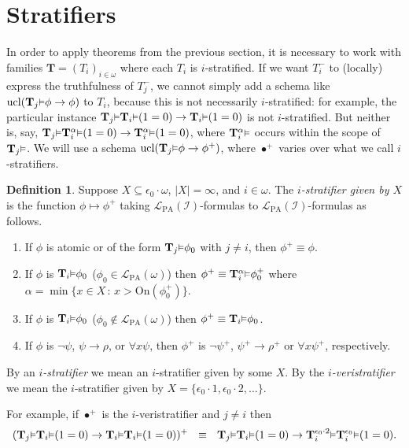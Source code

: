 \documentclass[reqno]{article}
\theoremstyle{definition}
\newtheorem{definition}[theorem]{Definition}
\def\L{\mathscr{L}}
\def\T{\mathbf{T}}
\def\LPA{\L_{\mathrm{PA}}}
\def\epom{\epsilon_0\cdot\omega}
\def\indset{\mathcal I}
\def\onset{\mathrm{On}}
\renewcommand{\Pr}[1]{\T_{#1}\mbox{\small${\vDash}$}}
\newcommand{\Prr}[2]{\T^{#1}_{#2}\mbox{\small${\vDash}$}}
\newcommand{\ucl}[1]{\mathrm{ucl}(#1)}
\begin{document}
\section{Stratifiers}
\label{stratifiersection}

In order to apply theorems from the previous section, it is necessary to work
with families $\T=(T_i)_{i\in\omega}$ where each $T_i$ is $i$-stratified.
If we want $T^-_i$ to (locally) express the truthfulness of $T^-_j$, we cannot simply
add a schema like $\ucl{\Pr j\phi\rightarrow\phi}$ to $T_i$, because this is not
necessarily $i$-stratified:  for example, the particular instance
$\Pr j\Pr i(1=0) \rightarrow \Pr i(1=0)$
is not $i$-stratified.  But neither is, say, $\Pr j\Prr\alpha i(1=0)\rightarrow \Prr\alpha i(1=0)$,
where $\Prr\alpha i$ occurs within the scope of $\Pr j$.
We will use a schema $\ucl{\Pr j\phi\rightarrow\phi^+}$,
where $\bullet^+$ varies over what we call $i$-stratifiers.

\begin{definition}
\label{stratifierdefn}
Suppose $X\subseteq\epom$, $|X|=\infty$, and $i\in\omega$.
The \emph{$i$-stratifier given by $X$}
is the function $\phi\mapsto\phi^+$ taking $\LPA(\indset)$-formulas to $\LPA(\indset)$-formulas
as follows.
\begin{enumerate}
\item If $\phi$ is atomic or of the form $\Pr j\phi_0$ with $j\not=i$, then $\phi^+\equiv\phi$.
\item If $\phi$ is $\Pr i\phi_0$ ($\phi_0\in \LPA(\omega)$) then $\phi^+\equiv \Prr\alpha i\phi^+_0$
where
$\alpha=\min\{x\in X\,:\,x>\onset(\phi^+_0)\}$.
\item If $\phi$ is $\Pr i\phi_0$ ($\phi_0\not\in \LPA(\omega)$) then $\phi^+\equiv
\Pr i\phi_0$.
\item If $\phi$ is $\neg\psi$, $\psi\rightarrow\rho$, or $\forall x\psi$, then
$\phi^+$ is $\neg\psi^+$, $\psi^+\rightarrow\rho^+$ or $\forall x\psi^+$, respectively.
\end{enumerate}
By an \emph{$i$-stratifier} we mean an $i$-stratifier given by some $X$.
By the \emph{$i$-veristratifier} we mean the $i$-stratifier
given by $X=\{\epsilon_0\cdot1,\epsilon_0\cdot2,\ldots\}$.
\end{definition}

For example, if $\bullet^+$ is the $i$-veristratifier and $j\not=i$ then
\[(\Pr j\Pr i(1=0)\rightarrow \Pr i\Pr i(1=0))^+ \,\,\,\,\equiv\,\,\,\,
\Pr j\Pr i(1=0)\rightarrow\Prr{\epsilon_0\cdot2}i\Prr{\epsilon_0} i(1=0).\]
\end{document}

